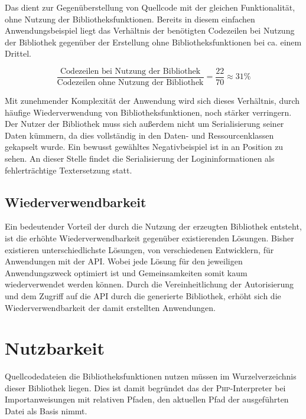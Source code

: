 Das  dient zur Gegenüberstellung von Quellcode mit der gleichen Funktionalität, ohne Nutzung der Bibliotheksfunktionen. Bereits in diesem einfachen Anwendungsbeispiel liegt das Verhältnis der benötigten Codezeilen bei Nutzung der Bibliothek gegenüber der Erstellung ohne Bibliotheksfunktionen bei ca. einem Drittel.

\[
  \frac{\text{Codezeilen bei Nutzung der Bibliothek}}{\text{Codezeilen ohne Nutzung der Bibliothek}} = \frac{22}{70} \approx 31\%
\]

Mit zunehmender Komplexität der Anwendung wird sich dieses Verhältnis, durch häufige Wiederverwendung von Bibliotheksfunktionen, noch stärker verringern. Der Nutzer der Bibliothek muss sich außerdem nicht um Serialisierung seiner Daten kümmern, da dies vollständig in den Daten- und Ressourcenklassen gekapselt wurde. Ein bewusst gewähltes Negativbeispiel ist in  an Position  zu sehen. An dieser Stelle findet die Serialisierung der Logininformationen als fehlerträchtige Textersetzung statt.

\newpage



\subsection{Wiederverwendbarkeit}
\label{sec:reusability}

Ein bedeutender Vorteil der durch die Nutzung der erzeugten Bibliothek entsteht, ist die erhöhte Wiederverwendbarkeit gegenüber existierenden Lösungen. Bisher existieren unterschiedlichste Lösungen, von verschiedenen Entwicklern, für Anwendungen mit der \gls{API}. Wobei jede Lösung für den jeweiligen Anwendungszweck optimiert ist und Gemeinsamkeiten somit kaum wiederverwendet werden können. Durch die Vereinheitlichung der Autorisierung und dem Zugriff auf die \gls{API} durch die generierte Bibliothek, erhöht sich die Wiederverwendbarkeit der damit erstellten Anwendungen.

\section{Nutzbarkeit}
\label{sec:usability}

Quellcodedateien die Bibliotheksfunktionen nutzen müssen im Wurzelverzeichnis dieser Bibliothek liegen. Dies ist damit begründet das der \textsc{Php}-Interpreter bei Importanweisungen mit relativen Pfaden, den aktuellen Pfad der ausgeführten Datei als Basis nimmt.

